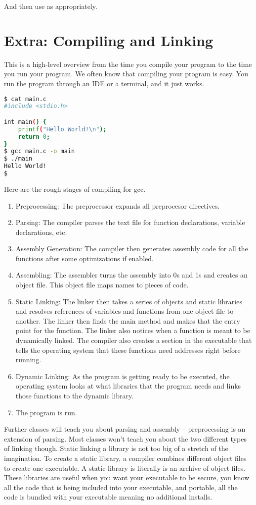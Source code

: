 And then use as appropriately.

\section{Extra: Compiling and Linking}

This is a high-level overview from the time you compile your program to the time you run your program.
We often know that compiling your program is easy.
You run the program through an IDE or a terminal, and it just works.

\begin{lstlisting}[language=bash]
$ cat main.c
#include <stdio.h>

int main() {
    printf("Hello World!\n");
    return 0;
}
$ gcc main.c -o main
$ ./main
Hello World!
$
\end{lstlisting}

Here are the rough stages of compiling for gcc.

\begin{enumerate}
\item Preprocessing: The preprocessor expands all preprocesor directives.
\item Parsing: The compiler parses the text file for function declarations, variable declarations, etc.
\item Assembly Generation: The compiler then generates assembly code for all the functions after some optimizations if enabled.
\item Assembling: The assembler turns the assembly into 0s and 1s and creates an object file. This object file maps names to pieces of code.
\item Static Linking: The linker then takes a series of objects and static libraries and resolves references of variables and functions from one object file to another. The linker then finds the main method and makes that the entry point for the function. The linker also notices when a function is meant to be dynamically linked. The compiler also creates a section in the executable that tells the operating system that these functions need addresses right before running. 
\item Dynamic Linking: As the program is getting ready to be executed, the operating system looks at what libraries that the program needs and links those functions to the dynamic library.
\item The program is run.
\end{enumerate}

Further classes will teach you about parsing and assembly -- preprocessing is an extension of parsing.
Most classes won't teach you about the two different types of linking though.
Static linking a library is not too big of a stretch of the imagination.
To create a static library, a compiler combines different object files to create one executable.
A static library is literally is an archive of object files.
These libraries are useful when you want your executable to be secure, you know all the code that is being included into your executable, and portable, all the code is bundled with your executable meaning no additional installs.

